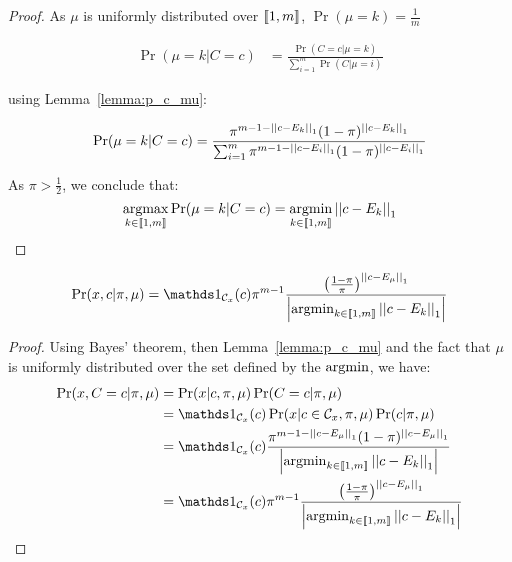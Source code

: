 \begin{proof}
As $\mu$ is uniformly distributed over $\left\llbracket1, m\right\rrbracket$, $\Pr(\mu = k) = \frac{1}{m}$

\begin{align}
    \Pr(\mu = k | C = c) 
    &= \frac{\Pr(C = c| \mu = k)}{\sum_{i = 1}^m \Pr(C | \mu = i)}
\end{align}

using Lemma~\ref{lemma:p_c_mu}:

\begin{align}
    \Pr(\mu = k | C = c)
    &= \frac{\pi^{m - 1 - \left|\left|c - E_k\right|\right|_1} (1 - \pi)^{\left|\left|c - E_k\right|\right|_1}}{\sum_{i = 1}^m \pi^{m - 1 - \left|\left|c - E_i\right|\right|_1} (1 - \pi)^{\left|\left|c - E_i\right|\right|_1}}\\
\end{align}

As $\pi > \frac{1}{2}$, we conclude that:
\[\operatorname*{argmax}_{k \in \left\llbracket1, m\right\rrbracket} \Pr(\mu = k | C = c) = \operatorname*{argmin}_{k \in \left\llbracket1, m\right\rrbracket} \left|\left|c - E_k\right|\right|_1\]
\end{proof}


\begin{lemma}
    \label{lemma:p_x_c_knowing_pi_mu_appendix}
    \[\Pr(x, c | \pi, \mu) = \indic{}_{\mathcal{C}_x}(c) \pi^{m-1}  \frac{\left(\frac{1 - \pi}{\pi}\right)^{\norm{c - E_{\mu}}_1}}{\card{\argmin_{k \in \bbrack{1, m}} \norm{c - E_k}_1}} \]
\end{lemma}
\begin{proof}
    Using Bayes' theorem, then Lemma~\ref{lemma:p_c_mu} and the fact that $\mu$ is uniformly distributed over the set defined by the $\operatorname*{argmin}$, we have:
    \begin{align}
        \Pr(x, C=c | \pi, \mu)
        &= \Pr(x | c, \pi, \mu) \Pr(C = c | \pi, \mu)\\
        &=  \indic{}_{\mathcal{C}_x}(c) \Pr(x | c \in \mathcal{C}_x, \pi, \mu) \Pr(c | \pi, \mu)\\
        &= \indic{}_{\mathcal{C}_x}(c) \frac{\pi^{m - 1 - \norm{c - E_{\mu}}_1} (1 - \pi)^{\norm{c - E_{\mu}}_1}}{\card{\argmin_{k \in \bbrack{1, m}} \norm{c - E_k}_1}}\\
        &= \indic{}_{\mathcal{C}_x}(c) \pi^{m-1}  \frac{\left(\frac{1 - \pi}{\pi}\right)^{\norm{c - E_{\mu}}_1}}{\card{\argmin_{k \in \bbrack{1, m}} \norm{c - E_k}_1}}
    \end{align}
\end{proof}


